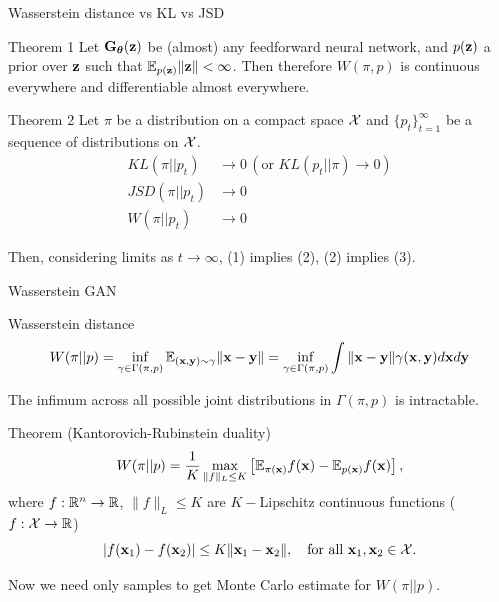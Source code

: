 \begin{frame}{Wasserstein distance vs KL vs JSD}
	\begin{block}{Theorem 1}
		Let $\mathbf{G}_{\boldsymbol{\theta}}(\mathbf{z})$ be (almost) any feedforward neural network, and $p(\mathbf{z})$ a prior over $\mathbf{z}$ such that $\mathbb{E}_{p(\mathbf{z})} \|\mathbf{z}\| < \infty$. Then therefore $W(\pi, p)$ is continuous everywhere and differentiable almost everywhere.
	\end{block}
	\begin{block}{Theorem 2}
		Let $\pi$ be a distribution on a compact space $\mathcal{X}$ and $\{p_t\}_{t=1}^\infty$ be a sequence of distributions on $\mathcal{X}$. 
		\begin{align}
			KL(\pi || p_t) &\rightarrow 0 \, (\text{or }KL (p_t || \pi) \rightarrow 0) \\
			JSD(\pi || p_t) &\rightarrow 0 \\
			W(\pi || p_t) &\rightarrow 0
		\end{align}
		
		Then, considering limits as $t \rightarrow \infty$, (1) implies (2), (2) implies (3).
	\end{block}
\end{frame}
\begin{frame}{Wasserstein GAN}
	\begin{block}{Wasserstein distance}
		\vspace{-0.5cm}
		\[
			W(\pi || p) = \inf_{\gamma \in \Gamma(\pi, p)} \mathbb{E}_{(\mathbf{x}, \mathbf{y}) \sim \gamma} \| \mathbf{x} - \mathbf{y} \| =  \inf_{\gamma \in \Gamma(\pi, p)} \int \| \mathbf{x} - \mathbf{y} \| \gamma (\mathbf{x}, \mathbf{y}) d \mathbf{x} d \mathbf{y}
		\]
		\vspace{-0.3cm}
	\end{block}
	The infimum across all possible joint distributions in $\Gamma(\pi, p)$ is intractable.
	\begin{block}{Theorem (Kantorovich-Rubinstein duality)}
		\vspace{-0.3cm}
		\[
			W(\pi || p) = \frac{1}{K} \max_{\| f \|_L \leq K} \left[ \mathbb{E}_{\pi(\mathbf{x})} f(\mathbf{x})  - \mathbb{E}_{p(\mathbf{x})} f(\mathbf{x})\right],
		\]
		where $f : \mathbb{R}^n \rightarrow \mathbb{R}$, $\| f \|_L \leq K$ are $K-$Lipschitz continuous functions ($f: \mathcal{X} \rightarrow \mathbb{R}$)
		\vspace{-0.2cm}
		\[
			|f(\mathbf{x}_1) - f(\mathbf{x}_2)| \leq K \| \mathbf{x}_1 - \mathbf{x}_2 \|, \quad \text{for all } \mathbf{x}_1, \mathbf{x}_2 \in \mathcal{X}.
		\]
		\vspace{-0.6cm}
	\end{block}
	Now we need only samples to get Monte Carlo estimate for $W(\pi || p)$.

\end{frame}
